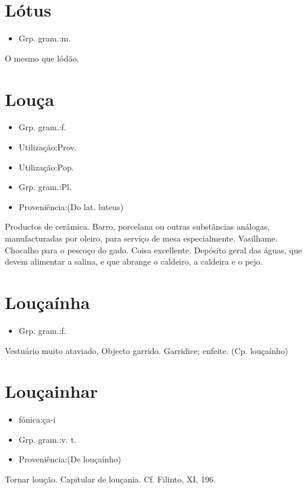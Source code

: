 \section{Lótus}
\begin{itemize}
\item {Grp. gram.:m.}
\end{itemize}
O mesmo que \textunderscore lódão\textunderscore .
\section{Louça}
\begin{itemize}
\item {Grp. gram.:f.}
\end{itemize}
\begin{itemize}
\item {Utilização:Prov.}
\end{itemize}
\begin{itemize}
\item {Utilização:Pop.}
\end{itemize}
\begin{itemize}
\item {Grp. gram.:Pl.}
\end{itemize}
\begin{itemize}
\item {Proveniência:(Do lat. \textunderscore luteus\textunderscore )}
\end{itemize}
Productos de cerâmica.
Barro, porcelana ou outras substâncias análogas, manufacturadas por oleiro, para serviço de mesa especialmente.
Vasilhame.
Chocalho para o pescoço do gado.
Coisa excellente.
Depósito geral das águas, que devem alimentar a salina, e que abrange o caldeiro, a caldeira e o pejo.
\section{Louçaínha}
\begin{itemize}
\item {Grp. gram.:f.}
\end{itemize}
Vestuário muito ataviado.
Objecto garrido.
Garridice; enfeite.
(Cp. \textunderscore louçaínho\textunderscore )
\section{Louçainhar}
\begin{itemize}
\item {fónica:ça-i}
\end{itemize}
\begin{itemize}
\item {Grp. gram.:v. t.}
\end{itemize}
\begin{itemize}
\item {Proveniência:(De \textunderscore louçaínho\textunderscore )}
\end{itemize}
Tornar loução.
Capitular de louçania. Cf. Filinto, XI, 196.

